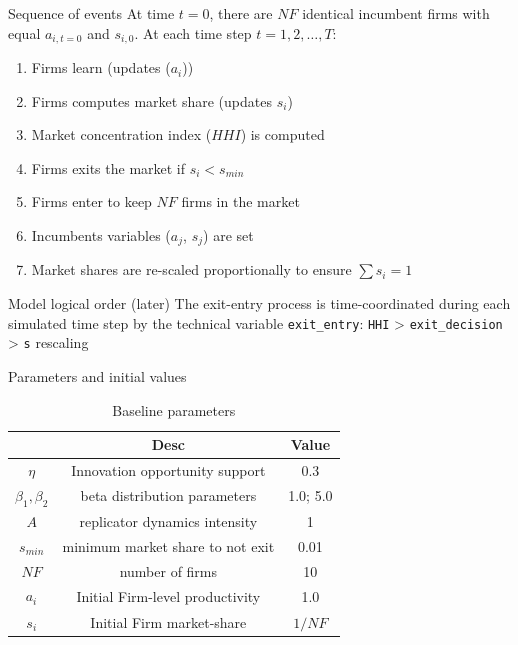\documentclass[bigger,aspectratio=169]{beamer}
\begin{document}
\begin{frame}[label={sec:orga8e56fa},fragile]{Sequence of events}
 At time \(t = 0\), there are \(NF\) identical incumbent firms with equal \(a_{i,t=0}\) and \(s_{i,0}\).
At each time step \(t = 1, 2, \ldots, T\):
\begin{enumerate}
\item Firms learn (updates (\(a_{i}\)))
\item Firms computes market share (updates \(s_{i}\))
\item Market concentration index (\(HHI\)) is computed
\item Firms exits the market if \(s_{i} < s_{min}\)
\item Firms enter to keep \(NF\) firms in the market
\item Incumbents variables (\(a_{j}\), \(s_{j}\)) are set
\item Market shares are re-scaled proportionally to ensure \(\sum s_{i} = 1\)
\end{enumerate}
\begin{block}{Model logical order (later)}
The exit-entry process is time-coordinated during each simulated time step by the technical variable \texttt{exit\_entry}: \texttt{HHI} > \texttt{exit\_decision} > \texttt{s} rescaling
\end{block}
\end{frame}
\begin{frame}[label={sec:orgcfa7dde}]{Parameters and initial values}
\begin{table}[htbp]
\caption{Baseline parameters}
\centering
\begin{tabular}{ccc}
\hline
 & Desc & Value\\
\hline
\(\eta\) & Innovation opportunity support & 0.3\\
\(\beta_{1}, \beta_{2}\) & beta distribution parameters & 1.0; 5.0\\
\(A\) & replicator dynamics intensity & 1\\
\(s_{min}\) & minimum market share to not exit & 0.01\\
\(NF\) & number of firms & 10\\
\hline
\(a_{i}_{}\) & Initial Firm-level productivity & 1.0\\
\(s_{i}\) & Initial Firm market-share & \(1/NF\)\\
\hline
\end{tabular}
\end{table}
\end{frame}
\end{document}

